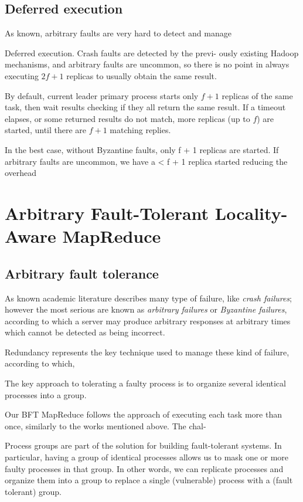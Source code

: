 \documentclass[sigchi]{acmart}
\begin{document}
\subsection{Deferred execution} As known, arbitrary faults are very hard to detect and manage 



Deferred execution. Crash faults are detected by the previ-
ously existing Hadoop mechanisms, and arbitrary faults are
uncommon, so there is no point in always executing $2f + 1$ replicas to usually obtain the same result.




By default, current leader primary process starts only $f + 1$ replicas of the same task, then wait results checking if they all return the same result. If a timeout elapses, or some returned results do not match, more replicas (up to $f$) are started, until there are $f + 1$ matching replies.



In the best case, without Byzantine faults, only f + 1 replicas are started. If arbitrary faults are uncommon, we have a < f + 1 replica started reducing the overhead 

\section{Arbitrary Fault-Tolerant Locality-Aware MapReduce}

\subsection{Arbitrary fault tolerance}

As known academic literature describes many type of failure, like \textit{crash failures}; however the most serious are known as \textit{arbitrary failures} or \textit{Byzantine failures}, according to which a server may produce arbitrary responses at arbitrary times which cannot be detected as being incorrect. 

Redundancy represents the key technique used to manage these kind of failure, according to which, 


The key approach to tolerating a faulty process is to organize several identical processes into a group. 


 Our BFT
MapReduce follows the approach of executing each task more
than once, similarly to the works mentioned above. The chal-



Process groups are part of the solution for building fault-tolerant systems.
In particular, having a group of identical processes allows us to mask one
or more faulty processes in that group. In other words, we can replicate
processes and organize them into a group to replace a single (vulnerable)
process with a (fault tolerant) group. 
\end{document}
